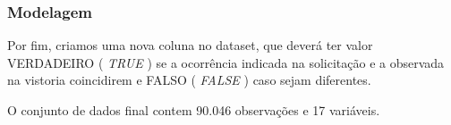 \documentclass[
]{article}
\newenvironment{Shaded}{\begin{snugshade}}{\end{snugshade}}
\newcommand{\KeywordTok}[1]{\textcolor[rgb]{0.13,0.29,0.53}{\textbf{#1}}}
\newcommand{\NormalTok}[1]{#1}
\newcommand{\OperatorTok}[1]{\textcolor[rgb]{0.81,0.36,0.00}{\textbf{#1}}}
\newcommand{\StringTok}[1]{\textcolor[rgb]{0.31,0.60,0.02}{#1}}
\begin{document}
\hypertarget{modelagem}{%
\subsubsection{Modelagem}\label{modelagem}}

\begin{Shaded}
\end{Shaded}

Por fim, criamos uma nova coluna no dataset, que deverá ter valor
VERDADEIRO ( \emph{TRUE} ) se a ocorrência indicada na solicitação e a
observada na vistoria coincidirem e FALSO ( \emph{FALSE} ) caso sejam
diferentes.

O conjunto de dados final contem 90.046 observações e 17 variáveis.
\end{document}
